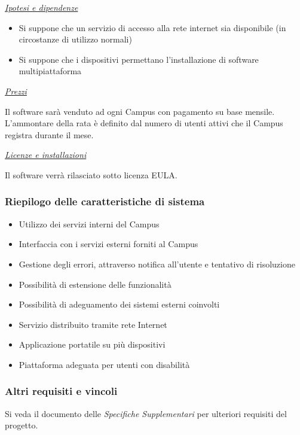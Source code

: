 \underline{\textit{Ipotesi e dipendenze}}

\begin{itemize}
	\item Si suppone  che un servizio di accesso alla rete internet sia disponibile (in circostanze di utilizzo normali)
	\item Si suppone che i dispositivi permettano l'installazione di software multipiattaforma
\end{itemize}

\newpage

\underline{\textit{Prezzi}}

Il software sarà venduto ad ogni Campus con pagamento su base mensile. L'ammontare della rata è definito dal numero di utenti attivi che il Campus registra durante il mese.

\underline{\textit{Licenze e installazioni}}

Il software verrà rilasciato sotto licenza EULA.

\subsubsection{Riepilogo delle caratteristiche di sistema}

\begin{itemize}
	\item Utilizzo dei servizi interni del Campus
	\item Interfaccia con i servizi esterni forniti al Campus
	\item Gestione degli errori, attraverso notifica all'utente e tentativo di risoluzione
	\item Possibilità di estensione delle funzionalità
	\item Possibilità di adeguamento dei sistemi esterni coinvolti
	\item Servizio distribuito tramite rete Internet
	\item Applicazione portatile su più dispositivi
	\item Piattaforma adeguata per utenti con disabilità
\end{itemize}

\subsubsection{Altri requisiti e vincoli}

Si veda il documento delle \textit{Specifiche Supplementari} per ulteriori requisiti del progetto.











